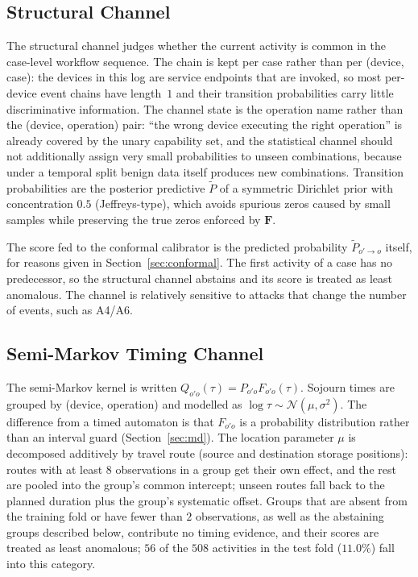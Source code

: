 \documentclass[manuscript,screen,review]{acmart}
\begin{document}
\subsection{Structural Channel}
\label{sec:struct}

The structural channel judges whether the current activity is common in the case-level workflow sequence. The chain is kept per case rather than per (device, case): the devices in this log are service endpoints that are invoked, so most per-device event chains have length~$1$ and their transition probabilities carry little discriminative information. The channel state is the operation name rather than the (device, operation) pair: ``the wrong device executing the right operation'' is already covered by the unary capability set, and the statistical channel should not additionally assign very small probabilities to unseen combinations, because under a temporal split benign data itself produces new combinations. Transition probabilities are the posterior predictive $\tilde P$ of a symmetric {Dirichlet} prior with concentration $0.5$ ({Jeffreys}-type), which avoids spurious zeros caused by small samples while preserving the true zeros enforced by $\mathbf F$.

The score fed to the conformal calibrator is the predicted probability $\tilde P_{o'\to o}$ itself, for reasons given in Section~\ref{sec:conformal}. The first activity of a case has no predecessor, so the structural channel abstains and its score is treated as least anomalous. The channel is relatively sensitive to attacks that change the number of events, such as {A4}/{A6}.

\subsection{Semi-Markov Timing Channel}
\label{sec:timing}

The semi-Markov kernel is written $Q_{o'o}(\tau)=P_{o'o}F_{o'o}(\tau)$. Sojourn times are grouped by (device, operation) and modelled as $\log\tau\sim\mathcal{N}(\mu,\sigma^2)$. The difference from a timed automaton is that $F_{o'o}$ is a probability distribution rather than an interval guard (Section~\ref{sec:md}). The location parameter $\mu$ is decomposed additively by travel route (source and destination storage positions): routes with at least $8$ observations in a group get their own effect, and the rest are pooled into the group's common intercept; unseen routes fall back to the planned duration plus the group's systematic offset. Groups that are absent from the training fold or have fewer than $2$ observations, as well as the abstaining groups described below, contribute no timing evidence, and their scores are treated as least anomalous; $56$ of the $508$ activities in the test fold ($11.0\%$) fall into this category.
\end{document}
